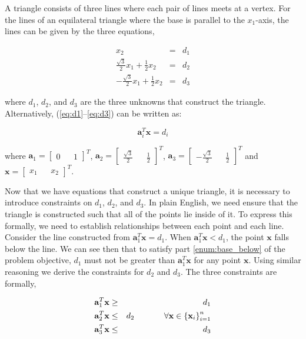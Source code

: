\documentclass{article}
\begin{document}
A triangle consists of three lines where each pair of lines meets at a vertex.
For the lines of an equilateral triangle where the base is parallel to the $x_1$-axis, the lines can be given by the three equations,

\begin{eqnarray} \label{eq:d1}
x_2 &=& d_1 \\
\label{eq:d2}
\frac{\sqrt{3}}{2} x_1 + \frac{1}{2} x_2 &=& d_2\\
\label{eq:d3}
-\frac{\sqrt{3}}{2} x_1 + \frac{1}{2} x_2 &=& d_3
\end{eqnarray}

\noindent where $d_1$, $d_2$, and $d_3$ are the three unknowns that construct the triangle.
Alternatively, (\ref{eq:d1}--\ref{eq:d3}) can be written as:

\begin{equation} \label{eq:triangle_lines_la}
\mathbf{a}_i^T \mathbf{x} = d_i
\end{equation}

\noindent where $\mathbf{a}_1 = \begin{bmatrix}0 && 1\end{bmatrix}^T$, $\mathbf{a}_2 = \begin{bmatrix}\frac{\sqrt{3}}{2} && \frac{1}{2}\end{bmatrix}^T$, $\mathbf{a}_3 = \begin{bmatrix}-\frac{\sqrt{3}}{2} && \frac{1}{2}\end{bmatrix}^T$ and $\mathbf{x} = \begin{bmatrix}x_1 && x_2\end{bmatrix}^T$.

Now that we have equations that construct a unique triangle, it is necessary to introduce constraints on $d_1$, $d_2$, and $d_3$.
In plain English, we need ensure that the triangle is constructed such that all of the points lie inside of it.
To express this formally, we need to establish relationships between each point and each line.
Consider the line constructed from $\mathbf{a}_1^T \mathbf{x} = d_1$. When $\mathbf{a}_1^T \mathbf{x} < d_1$, the point $\mathbf{x}$ falls below the line.
We can see then that to satisfy part \ref{enum:base_below} of the problem objective, $d_1$ must not be greater than $\mathbf{a}_1^T \mathbf{x}$ for any point $\mathbf{x}$.
Using similar reasoning we derive the constraints for $d_2$ and $d_3$. The three constraints are formally,

\begin{eqnarray}
\label{eq:const_1} \mathbf{a}_1^T \mathbf{x} &\ge& d_1\\
\label{eq:const_2} \mathbf{a}_2^T \mathbf{x} &\le& d_2 \hspace{0.5in} \forall{\mathbf{x}} \in \left\{ \mathbf{x}_i \right\}_{i=1}^n\\
\label{eq:const_3} \mathbf{a}_3^T \mathbf{x} &\le& d_3
\end{eqnarray}
\end{document}
